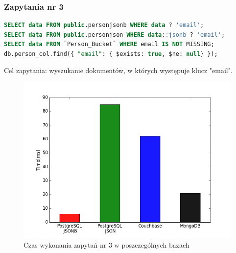 \documentclass[a4paper,12pt,table]{article}
\begin{document}
{\subsubsection{Zapytania nr 3}
\begin{lstlisting}[language=SQL,basicstyle=\footnotesize]
SELECT data FROM public.personjsonb WHERE data ? 'email';
SELECT data FROM public.personjson WHERE data::jsonb ? 'email';
SELECT data FROM `Person_Bucket` WHERE email IS NOT MISSING;
db.person_col.find({ "email": { $exists: true, $ne: null} });
\end{lstlisting}
\vspace{0.5cm}
Cel zapytania: wyszukanie dokumentów, w których występuje klucz "email".
\begin{figure}[h]
\begin{center}
\includegraphics[scale=0.5]{ax/fig3}
\end{center}
\caption{Czas wykonania zapytań nr 3 w poszczególnych bazach}
\end{figure}

}
\end{document}
